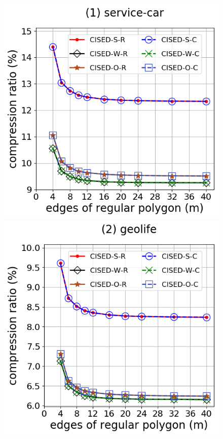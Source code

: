 \begin{figure}[tb!]
\centering
\includegraphics[scale = 0.3]{Figures/Exp-M-e-60-CR-service.png}
\includegraphics[scale = 0.3]{Figures/Exp-M-e-60-CR-geolife.png}

\end{figure}
